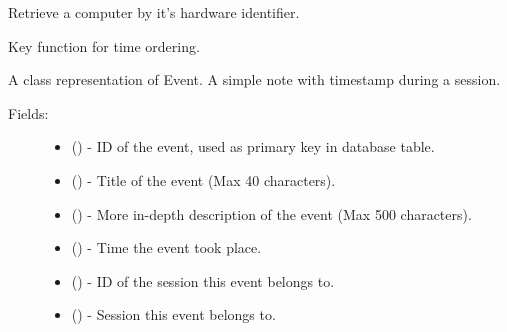 \documentclass[letterpaper,10pt,english]{sphinxmanual}
\begin{document}
\begin{fulllineitems}
\begin{description}
\end{description}

\begin{fulllineitems}
\label{models:models.Computer.get_most_recent_by_mac}
Retrieve a computer by it's hardware identifier.

\end{fulllineitems}


\begin{fulllineitems}
\label{models:models.Computer.time_ordering}
Key function for time ordering.

\end{fulllineitems}


\end{fulllineitems}


\begin{fulllineitems}
\label{models:models.Event}
A class representation of Event. A simple note with timestamp during a
session.
\begin{description}
\item[{Fields:}] \leavevmode\begin{itemize}
\item {} 
        ()        - ID of the event, used as primary key in database table.

\item {} 
        ()        - Title of the event (Max 40 characters).

\item {} 
        ()        - More in-depth description of the event (Max 500 characters).

\item {} 
        ()        - Time the event took place.

\item {} 
        ()        - ID of the session this event belongs to.

\item {} 
 ()        - Session this event belongs to.

\end{itemize}

\end{description}

\end{fulllineitems}
\end{document}
